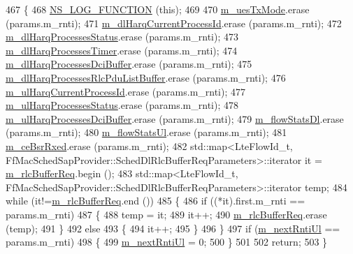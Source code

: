 \begin{DoxyCode}
467 \{
468   \hyperlink{log-macros-disabled_8h_a90b90d5bad1f39cb1b64923ea94c0761}{NS\_LOG\_FUNCTION} (\textcolor{keyword}{this});
469   
470   \hyperlink{classns3_1_1FdTbfqFfMacScheduler_a08550374df1be10395aa320fc1722066}{m\_uesTxMode}.erase (params.m\_rnti);
471   \hyperlink{classns3_1_1FdTbfqFfMacScheduler_a62be9c7aa20ef5d6994f9aa927f73858}{m\_dlHarqCurrentProcessId}.erase (params.m\_rnti);
472   \hyperlink{classns3_1_1FdTbfqFfMacScheduler_abc7e2984f379ab5a1855d815c439fa4f}{m\_dlHarqProcessesStatus}.erase  (params.m\_rnti);
473   \hyperlink{classns3_1_1FdTbfqFfMacScheduler_ae7a4cdc82a971f39b2238c472ceedf62}{m\_dlHarqProcessesTimer}.erase (params.m\_rnti);
474   \hyperlink{classns3_1_1FdTbfqFfMacScheduler_a3b740ad89004ff0fce4d87eea57508e5}{m\_dlHarqProcessesDciBuffer}.erase  (params.m\_rnti);
475   \hyperlink{classns3_1_1FdTbfqFfMacScheduler_ac885f8c49550f861905b5e790e346d7b}{m\_dlHarqProcessesRlcPduListBuffer}.erase  (params.m\_rnti);
476   \hyperlink{classns3_1_1FdTbfqFfMacScheduler_a36b22976070611aa3fdd5c573f891dc2}{m\_ulHarqCurrentProcessId}.erase  (params.m\_rnti);
477   \hyperlink{classns3_1_1FdTbfqFfMacScheduler_aa02927d2f9ea374d54c0fff160b5dbbc}{m\_ulHarqProcessesStatus}.erase  (params.m\_rnti);
478   \hyperlink{classns3_1_1FdTbfqFfMacScheduler_a8566c4093902c1a4c227fa795fa90756}{m\_ulHarqProcessesDciBuffer}.erase  (params.m\_rnti);
479   \hyperlink{classns3_1_1FdTbfqFfMacScheduler_ad55ff3305031aa6d2b3d351145754972}{m\_flowStatsDl}.erase  (params.m\_rnti);
480   \hyperlink{classns3_1_1FdTbfqFfMacScheduler_a104df6ff96dc70c7daeffa99ca042f96}{m\_flowStatsUl}.erase  (params.m\_rnti);
481   \hyperlink{classns3_1_1FdTbfqFfMacScheduler_a4affe9fe434a4cb87f5875ddf1766d61}{m\_ceBsrRxed}.erase (params.m\_rnti);
482   std::map<LteFlowId\_t, FfMacSchedSapProvider::SchedDlRlcBufferReqParameters>::iterator it = 
      \hyperlink{classns3_1_1FdTbfqFfMacScheduler_a1de1056077db96c215eb47ef724e1167}{m\_rlcBufferReq}.begin ();
483   std::map<LteFlowId\_t, FfMacSchedSapProvider::SchedDlRlcBufferReqParameters>::iterator temp;
484   \textcolor{keywordflow}{while} (it!=\hyperlink{classns3_1_1FdTbfqFfMacScheduler_a1de1056077db96c215eb47ef724e1167}{m\_rlcBufferReq}.end ())
485     \{
486       \textcolor{keywordflow}{if} ((*it).first.m\_rnti == params.m\_rnti)
487         \{
488           temp = it;
489           it++;
490           \hyperlink{classns3_1_1FdTbfqFfMacScheduler_a1de1056077db96c215eb47ef724e1167}{m\_rlcBufferReq}.erase (temp);
491         \}
492       \textcolor{keywordflow}{else}
493         \{
494           it++;
495         \}
496     \}
497   \textcolor{keywordflow}{if} (\hyperlink{classns3_1_1FdTbfqFfMacScheduler_adcaedd73d9597af47782db5e9f605544}{m\_nextRntiUl} == params.m\_rnti)
498     \{
499       \hyperlink{classns3_1_1FdTbfqFfMacScheduler_adcaedd73d9597af47782db5e9f605544}{m\_nextRntiUl} = 0;
500     \}
501 
502   \textcolor{keywordflow}{return};
503 \}
\end{DoxyCode}


